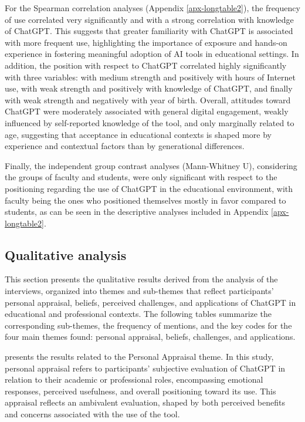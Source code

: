\documentclass[english]{textolivre}
\begin{document}
For the Spearman correlation analyses (Appendix \ref{apx-longtable2}), the frequency of use correlated very significantly and with a strong correlation with knowledge of ChatGPT. This suggests that greater familiarity with ChatGPT is associated with more frequent use, highlighting the importance of exposure and hands-on experience in fostering meaningful adoption of AI tools in educational settings. In addition, the position with respect to ChatGPT correlated highly significantly with three variables: with medium strength and positively with hours of Internet use, with weak strength and positively with knowledge of ChatGPT, and finally with weak strength and negatively with year of birth. Overall, attitudes toward ChatGPT were moderately associated with general digital engagement, weakly influenced by self-reported knowledge of the tool, and only marginally related to age, suggesting that acceptance in educational contexts is shaped more by experience and contextual factors than by generational differences.

Finally, the independent group contrast analyses (Mann-Whitney U), considering the groups of faculty and students, were only significant with respect to the positioning regarding the use of ChatGPT in the educational environment, with faculty being the ones who positioned themselves mostly in favor compared to students, as can be seen in the descriptive analyses included in Appendix \ref{apx-longtable2}.

\subsection{Qualitative analysis}\label{sec-autores}
This section presents the qualitative results derived from the analysis of the interviews, organized into themes and sub-themes that reflect participants’ personal appraisal, beliefs, perceived challenges, and applications of ChatGPT in educational and professional contexts. The following tables summarize the corresponding sub-themes, the frequency of mentions, and the key codes for the four main themes found: personal appraisal, beliefs, challenges, and applications.

 presents the results related to the Personal Appraisal theme. In this study, personal appraisal refers to participants’ subjective evaluation of ChatGPT in relation to their academic or professional roles, encompassing emotional responses, perceived usefulness, and overall positioning toward its use. This appraisal reflects an ambivalent evaluation, shaped by both perceived benefits and concerns associated with the use of the tool.
\end{document}
